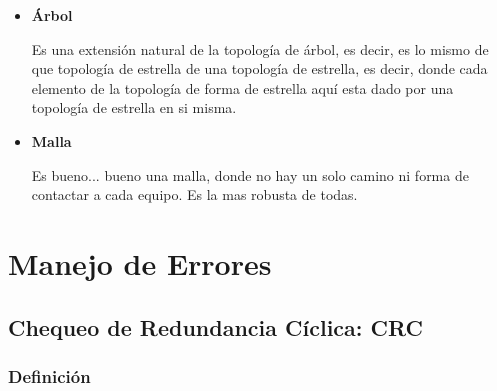 \documentclass[12pt, fleqn]{report}                             %
\theoremstyle{break}                                            %
\begin{document}
\begin{itemize}
                \clearpage

                \item \textbf{Árbol}
                
                    Es una extensión natural de la topología de árbol, es decir, es lo mismo de que topología
                    de estrella de una topología de estrella, es decir, donde cada elemento de la topología
                    de forma de estrella aquí esta dado por una topología de estrella en si misma.

                \item \textbf{Malla}
                
                    Es bueno... bueno una malla, donde no hay un solo camino ni forma de contactar a cada equipo.
                    Es la mas robusta de todas.

            \end{itemize}

            







    \chapter{Manejo de Errores}


        \clearpage
        \section{Chequeo de Redundancia Cíclica: CRC}

            \subsection{Definición}
\end{document}
